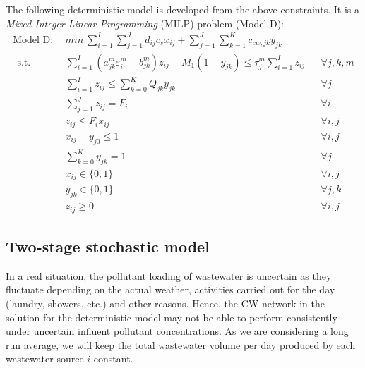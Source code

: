 \documentclass[preprint,12pt,authoryear]{elsarticle}
\begin{document}
The following deterministic model is developed from the above constraints. It is a \emph{Mixed-Integer Linear Programming} (MILP) problem (Model D):
\setcounter{equation}{0}
\begin{align}\label{model:D}
	\text{Model D}:~~&min ~ \sum_{i=1}^{I}\sum_{j=1}^{J}d_{ij}c_s x_{ij} + \sum_{j=1}^{J}\sum_{k=1}^{K}c_{cw,jk}y_{jk}\nonumber\\~~
	\mbox{s.t.}~~
	&\sum_{i=1}^{I} (a_{jk}^m \varepsilon_i^m + b_{jk}^m) z_{ij} - M_1(1 - y_{jk}) \leq \tau_j^m \sum_{i=1}^I z_{ij}  && \forall j,k,m\\
 	&\sum_{i=1}^{I} z_{ij} \leq \sum_{k=0}^K Q_{jk} y_{jk} && \forall j\\
	&\sum_{j=1}^J z_{ij} = F_i && \forall i\\
	&z_{ij} \leq F_i x_{ij} && \forall i,j\\
	&x_{ij} + y_{j0} \leq 1 && \forall i,j\\
	&\sum_{k=0}^{K}y_{jk} = 1&&\forall j\\
	&x_{ij} \in \{0,1\}&&\forall i,j\\
	&y_{jk} \in \{0,1\}&&\forall j,k\\
	&z_{ij} \geq 0&&\forall i,j
\end{align}
\renewcommand{\theequation}{\thesection--\arabic{equation}}


\pagebreak
\subsection{Two-stage stochastic model}\label{stomodel}
In a real situation, the pollutant loading of wastewater is uncertain as they fluctuate depending on the actual weather, activities carried out for the day (laundry, showers, etc.) and other reasons. Hence, the CW network in the solution for the deterministic model may not be able to perform consistently under uncertain influent pollutant concentrations. As we are considering a long run average, we will keep the total wastewater volume per day produced by each wastewater source $i$ constant. 
\end{document}
